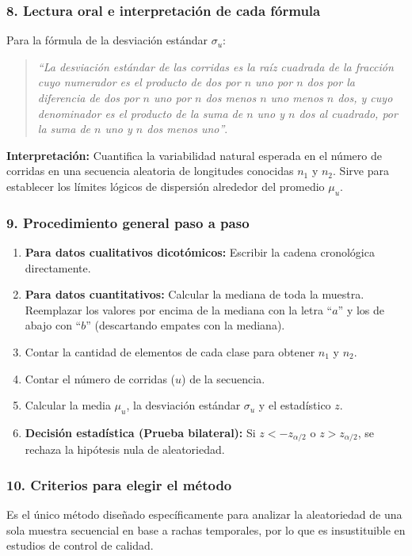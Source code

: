 \documentclass[11pt,a4paper]{article}
\begin{document}
\subsubsection{8. Lectura oral e interpretación de cada fórmula}
Para la fórmula de la desviación estándar $\sigma_u$:
\begin{quote}
    \textit{``La desviación estándar de las corridas es la raíz cuadrada de la fracción cuyo numerador es el producto de dos por $n$ uno por $n$ dos por la diferencia de dos por $n$ uno por $n$ dos menos $n$ uno menos $n$ dos, y cuyo denominador es el producto de la suma de $n$ uno y $n$ dos al cuadrado, por la suma de $n$ uno y $n$ dos menos uno''}.
\end{quote}
\textbf{Interpretación:} Cuantifica la variabilidad natural esperada en el número de corridas en una secuencia aleatoria de longitudes conocidas $n_1$ y $n_2$. Sirve para establecer los límites lógicos de dispersión alrededor del promedio $\mu_u$.

\subsubsection{9. Procedimiento general paso a paso}
\begin{enumerate}
    \item \textbf{Para datos cualitativos dicotómicos:} Escribir la cadena cronológica directamente.
    \item \textbf{Para datos cuantitativos:} Calcular la mediana de toda la muestra. Reemplazar los valores por encima de la mediana con la letra ``$a$'' y los de abajo con ``$b$'' (descartando empates con la mediana).
    \item Contar la cantidad de elementos de cada clase para obtener $n_1$ y $n_2$.
    \item Contar el número de corridas ($u$) de la secuencia.
    \item Calcular la media $\mu_u$, la desviación estándar $\sigma_u$ y el estadístico $z$.
    \item \textbf{Decisión estadística (Prueba bilateral):} Si $z < -z_{\alpha/2}$ o $z > z_{\alpha/2}$, se rechaza la hipótesis nula de aleatoriedad.
\end{enumerate}

\subsubsection{10. Criterios para elegir el método}
Es el único método diseñado específicamente para analizar la aleatoriedad de una sola muestra secuencial en base a rachas temporales, por lo que es insustituible en estudios de control de calidad.
\end{document}
